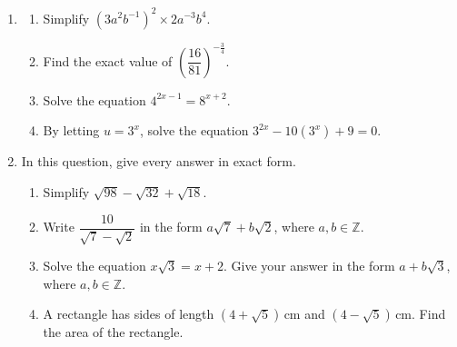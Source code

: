 \documentclass[12pt, twoside]{article}
\begin{document}
\begin{enumerate}[itemsep=0.15cm]

\newpage

\item[5.]

\begin{enumerate}[itemsep=0.1cm]
  \item Simplify $\left(3a^{2}b^{-1}\right)^{2} \times 2a^{-3}b^{4}$.
  \item Find the exact value of $\left(\dfrac{16}{81}\right)^{-\frac{3}{4}}$.
  \item Solve the equation $4^{2x - 1} = 8^{x + 2}$.
  \item By letting $u = 3^{x}$, solve the equation
  $3^{2x} - 10\left(3^{x}\right) + 9 = 0$.
\end{enumerate}


\newpage

\item[6.]
In this question, give every answer in exact form.

\begin{enumerate}[itemsep=0.1cm]
  \item Simplify $\sqrt{98} - \sqrt{32} + \sqrt{18}$.
  \item Write $\dfrac{10}{\sqrt{7} - \sqrt{2}}$ in the form
  $a\sqrt{7} + b\sqrt{2}$, where $a, b \in \mathbb{Z}$.
  \item Solve the equation $x\sqrt{3} = x + 2$. Give your answer in the
  form $a + b\sqrt{3}$, where $a, b \in \mathbb{Z}$.
  \item A rectangle has sides of length $\left(4 + \sqrt{5}\right)\,\text{cm}$
  and $\left(4 - \sqrt{5}\right)\,\text{cm}$. Find the area of the
  rectangle.
\end{enumerate}


\end{enumerate}
\end{document}
